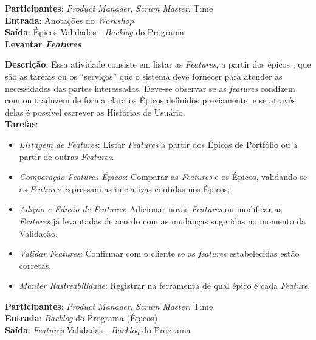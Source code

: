   \textbf{Participantes}: \textit{Product Manager}, \textit{Scrum Master}, Time \\

  \textbf{Entrada}: Anotações do \textit{Workshop} \\

  \textbf{Saída}: Épicos Validados - \textit{Backlog} do Programa\\

\textbf{Levantar \textit{Features}}

\textbf{Descrição}: Essa atividade consiste em listar as \textit{Features}, a partir dos épicos ,
que são as tarefas ou os “serviços” que o sistema deve fornecer para atender as necessidades das partes interessadas.
Deve-se observar se as \textit{features} condizem com ou traduzem de forma clara os Épicos
definidos previamente, e se através delas é possível escrever as Histórias de Usuário.\\

\textbf{Tarefas}:

  \begin{itemize}
   \item \indent \textit{Listagem de \textit{Features}}:  Listar \textit{Features} a partir dos Épicos de Portfólio ou a partir de outras \textit{Features}.
   
   \item \indent \textit{Comparação \textit{Features}-Épicos}: Comparar as \textit{Features} e os Épicos, validando se as \textit{Features} expressam as iniciativas contidas nos Épicos;

   \item \indent \textit{Adição e Edição de \textit{Features}}: Adicionar novas \textit{Features} ou modificar as \textit{Features} já levantadas de acordo com as mudanças sugeridas no momento da Validação.

   \item \indent \textit{Validar \textit{Features}}: Confirmar com o cliente se as \textit{features} estabelecidas estão corretas. 
   
   \item \indent \textit{Manter Rastreabilidade}: Registrar na ferramenta de qual épico é cada \textit{Feature}.
   \end{itemize}

\textbf{Participantes}: \textit{Product Manager}, \textit{Scrum Master}, Time \\

\textbf{Entrada}: \textit{Backlog} do Programa (Épicos) \\

\textbf{Saída}:  \textit{Features} Validadas - \textit{Backlog} do Programa  \\
